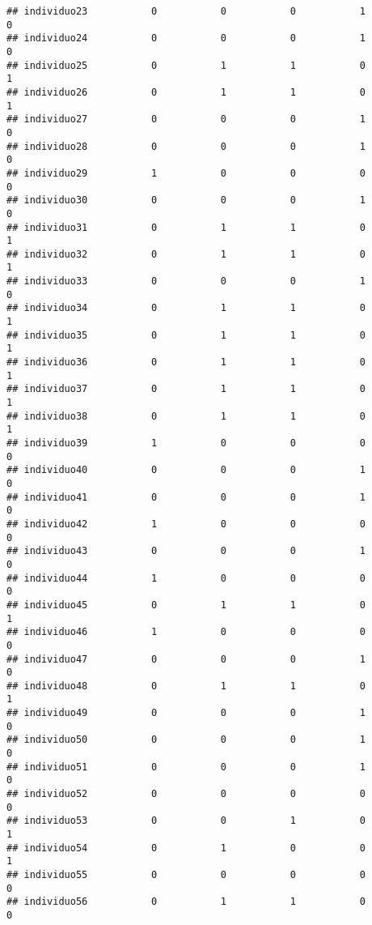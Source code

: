 \documentclass[
]{article}
\begin{document}
\begin{verbatim}
## individuo23           0           0           0           1           0
## individuo24           0           0           0           1           0
## individuo25           0           1           1           0           1
## individuo26           0           1           1           0           1
## individuo27           0           0           0           1           0
## individuo28           0           0           0           1           0
## individuo29           1           0           0           0           0
## individuo30           0           0           0           1           0
## individuo31           0           1           1           0           1
## individuo32           0           1           1           0           1
## individuo33           0           0           0           1           0
## individuo34           0           1           1           0           1
## individuo35           0           1           1           0           1
## individuo36           0           1           1           0           1
## individuo37           0           1           1           0           1
## individuo38           0           1           1           0           1
## individuo39           1           0           0           0           0
## individuo40           0           0           0           1           0
## individuo41           0           0           0           1           0
## individuo42           1           0           0           0           0
## individuo43           0           0           0           1           0
## individuo44           1           0           0           0           0
## individuo45           0           1           1           0           1
## individuo46           1           0           0           0           0
## individuo47           0           0           0           1           0
## individuo48           0           1           1           0           1
## individuo49           0           0           0           1           0
## individuo50           0           0           0           1           0
## individuo51           0           0           0           1           0
## individuo52           0           0           0           0           0
## individuo53           0           0           1           0           1
## individuo54           0           1           0           0           1
## individuo55           0           0           0           0           0
## individuo56           0           1           1           0           0
\end{verbatim}
\end{document}
